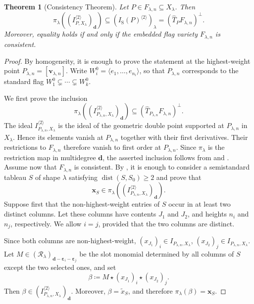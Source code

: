 \documentclass[a4paper,reqno]{amsart}
\theoremstyle{plainnopunct}
\newtheorem{theorem}{Theorem}[section]
\theoremstyle{definitionnopunct}
\newcommand{\cR}{\mathcal{R}}
\newcommand{\dist}{\operatorname{dist}}
\newcommand{\bx}{\mathbf{x}}
\newcommand{\bv}{\mathbf{v}}
\newcommand{\bd}{\mathbf{d}}
\newcommand{\bepsilon}{\boldsymbol{\varepsilon}}
\begin{document}
\begin{theorem}[Consistency Theorem]
\label{thm: consistency}
Let $P\in F_{\lambda,n}\subseteq X_\lambda$.
Then
\[
\pi_\lambda
\left(
\left(
I_{P,X_\lambda}^{\langle2\rangle}
\right)_{\bd}
\right)
\subseteq
\left(
I_{\mathrm S}(P)^{\langle2\rangle}
\right)_\lambda
=
\left(
\widehat T_PF_{\lambda,n}
\right)^\perp.
\]
Moreover, equality holds if and only if the embedded flag variety
$F_{\lambda,n}$ is consistent.
\end{theorem}

\begin{proof}
By homogeneity, it is enough to prove the statement at the
highest-weight point $P_{\lambda,n}
=
[\bv_{\lambda,n}]$.
Write $W_i^0
=
\langle e_1,\ldots,e_{n_i}\rangle$,
so that $P_{\lambda,n}$ corresponds to the standard flag $W_1^0
\subsetneq
\cdots
\subsetneq
W_k^0$.

We first prove the inclusion
\[
\pi_\lambda
\left(
\left(
I_{P_{\lambda,n},X_\lambda}^{\langle2\rangle}
\right)_{\bd}
\right)
\subseteq
\left(
\widehat T_{P_{\lambda,n}}F_{\lambda,n}
\right)^\perp.
\]
The ideal $I_{P_{\lambda,n},X_\lambda}^{\langle2\rangle}$
is the ideal of the geometric double point supported at
$P_{\lambda,n}$ in $X_\lambda$. Hence its elements vanish at
$P_{\lambda,n}$ together with their first derivatives. Their
restrictions to $F_{\lambda,n}$ therefore vanish to first order at
$P_{\lambda,n}$. Since $\pi_\lambda$ is the restriction map in
multidegree $\bd$, the asserted inclusion follows from
 and .
Assume now that $F_{\lambda,n}$ is consistent. By
, it is enough to consider a
semistandard tableau $S$ of shape $\lambda$ satisfying $\dist(S,S_0)\geq2$
and prove that
\[
\bx_S
\in
\pi_\lambda
\left(
\left(
I_{P_{\lambda,n},X_\lambda}^{\langle2\rangle}
\right)_{\bd}
\right).
\]
Suppose first that the non-highest-weight entries of $S$ occur in at
least two distinct columns. Let these columns have contents $J_1$ and
$J_2$, and heights $n_i$ and $n_j$, respectively. We allow $i=j$,
provided that the two columns are distinct.

Since both columns are non-highest-weight,
$(x_{J_1})_i
\in
I_{P_{\lambda,n},X_\lambda}$,
$(x_{J_2})_j
\in
I_{P_{\lambda,n},X_\lambda}$.
Let
$M
\in
(\cR_\lambda)_{\bd-\bepsilon_i-\bepsilon_j}
$
be the slot monomial determined by all columns of $S$ except the two
selected ones, and set
\[
\beta
\coloneq
M\star(x_{J_1})_i\star(x_{J_2})_j.
\]
Then
$\beta
\in
\left(
I_{P_{\lambda,n},X_\lambda}^{\langle2\rangle}
\right)_{\bd}$.
Moreover, $\beta=\widetilde{x}_S$, and therefore $\pi_\lambda(\beta)=\bx_S$.


\end{proof}
\end{document}
